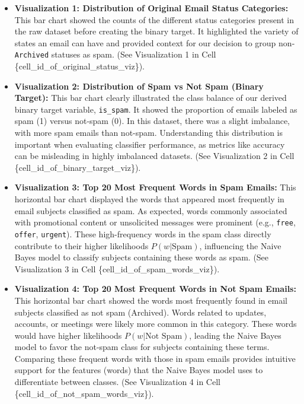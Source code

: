 \documentclass[12pt,letterpaper]{article}
\begin{document}
\begin{itemize}
    \item \textbf{Visualization 1: Distribution of Original Email Status Categories:} This bar chart showed the counts of the different status categories present in the raw dataset before creating the binary target. It highlighted the variety of states an email can have and provided context for our decision to group non-\texttt{Archived} statuses as spam. (See Visualization 1 in Cell \{cell\_id\_of\_original\_status\_viz\}).
    
    \item \textbf{Visualization 2: Distribution of Spam vs Not Spam (Binary Target):} This bar chart clearly illustrated the class balance of our derived binary target variable, \texttt{is\_spam}. It showed the proportion of emails labeled as spam (1) versus not-spam (0). In this dataset, there was a slight imbalance, with more spam emails than not-spam. Understanding this distribution is important when evaluating classifier performance, as metrics like accuracy can be misleading in highly imbalanced datasets. (See Visualization 2 in Cell \{cell\_id\_of\_binary\_target\_viz\}).
    
    \item \textbf{Visualization 3: Top 20 Most Frequent Words in Spam Emails:} This horizontal bar chart displayed the words that appeared most frequently in email subjects classified as spam. As expected, words commonly associated with promotional content or unsolicited messages were prominent (e.g., \texttt{free}, \texttt{offer}, \texttt{urgent}). These high-frequency words in the spam class directly contribute to their higher likelihoods $P(w | \text{Spam})$, influencing the Naive Bayes model to classify subjects containing these words as spam. (See Visualization 3 in Cell \{cell\_id\_of\_spam\_words\_viz\}).
    
    \item \textbf{Visualization 4: Top 20 Most Frequent Words in Not Spam Emails:} This horizontal bar chart showed the words most frequently found in email subjects classified as not spam (Archived). Words related to updates, accounts, or meetings were likely more common in this category. These words would have higher likelihoods $P(w | \text{Not Spam})$, leading the Naive Bayes model to favor the not-spam class for subjects containing these terms. Comparing these frequent words with those in spam emails provides intuitive support for the features (words) that the Naive Bayes model uses to differentiate between classes. (See Visualization 4 in Cell \{cell\_id\_of\_not\_spam\_words\_viz\}).
\end{itemize}
\end{document}
